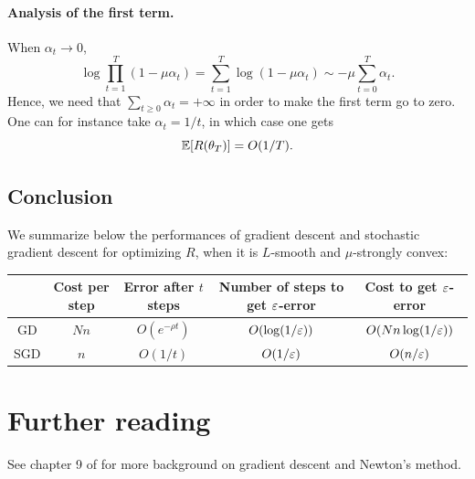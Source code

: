 \documentclass[11pt,nocut]{article}
\begin{document}
\paragraph{Analysis of the first term.}
When $\alpha_t \to 0$, 
$$\log \prod_{t=1}^T (1-\mu \alpha_t) =\sum_{t=1}^T \log (1-\mu \alpha_t) \sim - \mu \sum_{t=0}^{T} \alpha_t.$$
Hence, we need that $\sum_{t \geq 0} \alpha_t = +\infty$ in order to make the first term go to zero.
\\

One can for instance take $\alpha_t = 1/t$, in which case one gets
$$
\mathbb{E}[R(\theta_T)] = O(1/T).
$$

\subsection{Conclusion}

We summarize below the performances of gradient descent and stochastic gradient descent for optimizing $R$, when it is $L$-smooth and $\mu$-strongly convex: 
\begin{center}
\begin{tabular}{ |c|c|c|c|c| } 
 \hline
 & Cost per step & Error after $t$ steps & Number of steps to get ${\varepsilon}$-error
 & Cost to get ${\varepsilon}$-error\\
 \hline
	GD & $Nn$ & $O(e^{-\rho t})$ & $O(\log(1/{\varepsilon}))$ & $O(Nn\log(1/{\varepsilon}))$\\ 
	SGD & $n$ & $O(1/t)$ & $O(1/{\varepsilon})$ & $O(n/{\varepsilon})$\\ 
 \hline
\end{tabular}
\end{center}





\section*{Further reading}

See chapter 9 of \cite{boyd2004convex} for more background on gradient descent and Newton's method.

\vspace{1cm}
\centerline{}




\end{document}
